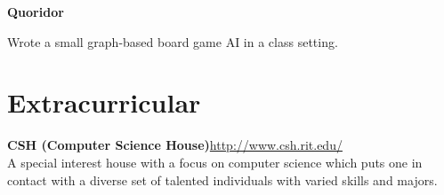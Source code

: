 \documentclass[letter,margin,line]{resume}
\newcommand{\rurl}[1]{\hfill {\footnotesize \url{#1}}}
\begin{document}
\begin{resume}
\begin{asparablank}
		\item {\bf Quoridor}
		
		\small Wrote a small graph-based board game AI in a class setting.
		\normalsize
		\\
		
	\end{asparablank}	

\section{\mysidestyle Extracurricular}
	\begin{asparablank}
		\item {\bf CSH ({\small Computer Science House})}\rurl{http://www.csh.rit.edu/}
		\\		
		\small A special interest house with a focus on computer science which puts one in contact with a diverse set of talented individuals with varied skills and majors.
	\end{asparablank}

\end{resume}
\end{document}
